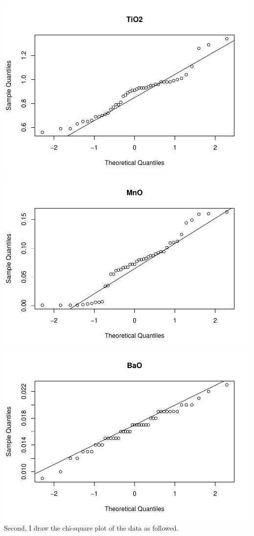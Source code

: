 \documentclass[
]{article}
\begin{document}
\includegraphics[width=0.33\linewidth,height=0.25\textheight]{hudm6122_hw_01_ChenguangPan_files/figure-latex/unnamed-chunk-3-7}
\includegraphics[width=0.33\linewidth,height=0.25\textheight]{hudm6122_hw_01_ChenguangPan_files/figure-latex/unnamed-chunk-3-8}
\includegraphics[width=0.33\linewidth,height=0.25\textheight]{hudm6122_hw_01_ChenguangPan_files/figure-latex/unnamed-chunk-3-9}
Second, I draw the chi-square plot of the data as followed.
\end{document}
